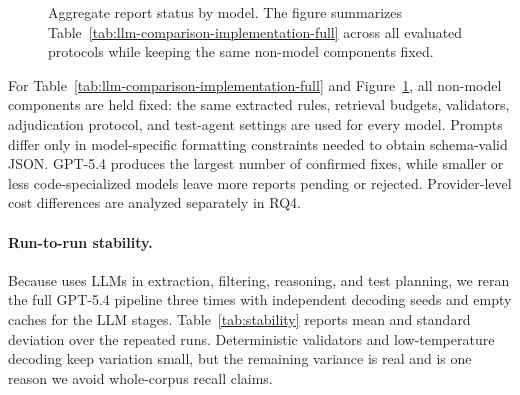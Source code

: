 \begin{figure}[t]
\centering
{}
\caption{Aggregate report status by model. The figure summarizes
Table~\ref{tab:llm-comparison-implementation-full} across all evaluated
protocols while keeping the same non-model components fixed.}
\label{fig:model-comparison-bars}
\end{figure}

For Table~\ref{tab:llm-comparison-implementation-full} and
Figure~\ref{fig:model-comparison-bars}, all non-model components are held
fixed: the same extracted rules, retrieval budgets, validators, adjudication
protocol, and test-agent settings are used for every model. Prompts differ only
in model-specific formatting constraints needed to obtain schema-valid JSON.
GPT-5.4 produces the largest number of confirmed fixes, while smaller or less
code-specialized models leave more reports pending or rejected. Provider-level
cost differences are analyzed separately in RQ4.

\paragraph{Run-to-run stability.}
Because \tool{} uses LLMs in extraction, filtering, reasoning, and test
planning, we reran the full GPT-5.4 pipeline three times with independent
decoding seeds and empty caches for the LLM stages. Table~\ref{tab:stability}
reports mean and standard deviation over the repeated runs. Deterministic
validators and low-temperature decoding keep variation small, but the
remaining variance is real and is one reason we avoid whole-corpus recall
claims.

